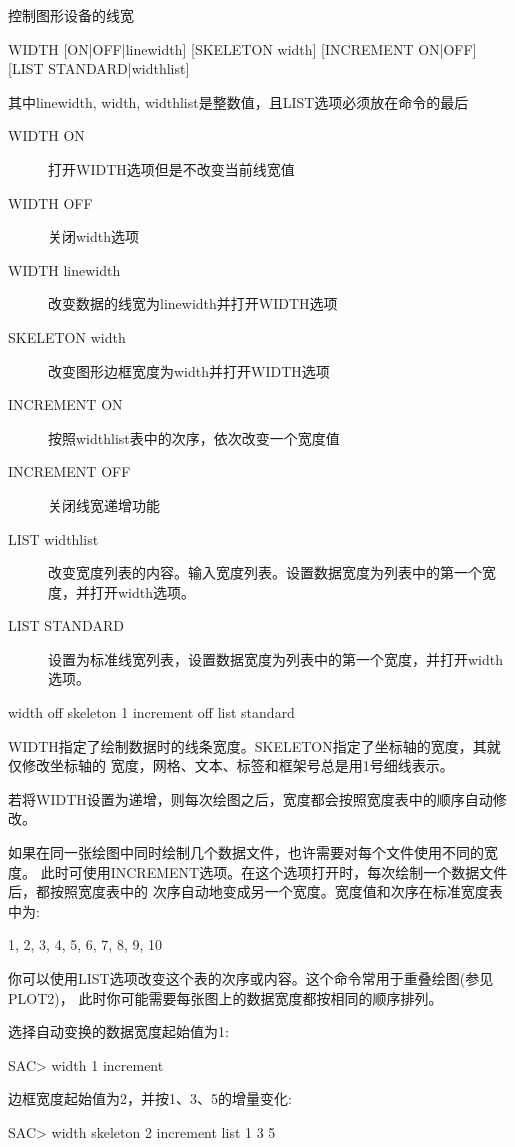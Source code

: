 \label{cmd:width}

控制图形设备的线宽

\begin{SACSTX}
WIDTH [ON|OFF|linewidth] [SKELETON width] [INCREMENT ON|OFF] 
    [LIST STANDARD|widthlist]
\end{SACSTX}
其中linewidth, width, widthlist是整数值，且LIST选项必须放在命令的最后

\begin{description}
\item [WIDTH ON] 打开WIDTH选项但是不改变当前线宽值
\item [WIDTH OFF] 关闭width选项
\item [WIDTH linewidth] 改变数据的线宽为linewidth并打开WIDTH选项
\item [SKELETON width] 改变图形边框宽度为width并打开WIDTH选项 
\item [INCREMENT ON] 按照widthlist表中的次序，依次改变一个宽度值 
\item [INCREMENT OFF] 关闭线宽递增功能 
\item [LIST widthlist] 改变宽度列表的内容。输入宽度列表。设置数据宽度为列表中的第一个宽度，并打开width选项。 
\item [LIST STANDARD] 设置为标准线宽列表，设置数据宽度为列表中的第一个宽度，并打开width选项。 
\end{description}

\begin{SACDFT}
width off skeleton 1 increment off list standard
\end{SACDFT}

WIDTH指定了绘制数据时的线条宽度。SKELETON指定了坐标轴的宽度，其就仅修改坐标轴的
宽度，网格、文本、标签和框架号总是用1号细线表示。

若将WIDTH设置为递增，则每次绘图之后，宽度都会按照宽度表中的顺序自动修改。

如果在同一张绘图中同时绘制几个数据文件，也许需要对每个文件使用不同的宽度。
此时可使用INCREMENT选项。在这个选项打开时，每次绘制一个数据文件后，都按照宽度表中的
次序自动地变成另一个宽度。宽度值和次序在标准宽度表中为:
\begin{SACCode}
1, 2, 3, 4, 5, 6, 7, 8, 9, 10
\end{SACCode}
你可以使用LIST选项改变这个表的次序或内容。这个命令常用于重叠绘图(参见PLOT2)，
此时你可能需要每张图上的数据宽度都按相同的顺序排列。

选择自动变换的数据宽度起始值为1:
\begin{SACCode}
SAC> width 1 increment
\end{SACCode}

边框宽度起始值为2，并按1、3、5的增量变化:
\begin{SACCode}
SAC> width skeleton 2 increment list 1 3 5
\end{SACCode}
